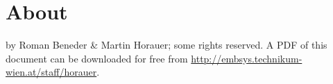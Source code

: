 \section*{About}
\textcopyright{} by Roman Beneder \& Martin Horauer; some rights reserved. 
A PDF of this document can be downloaded for free from 
\url{http://embsys.technikum-wien.at/staff/horauer}.

